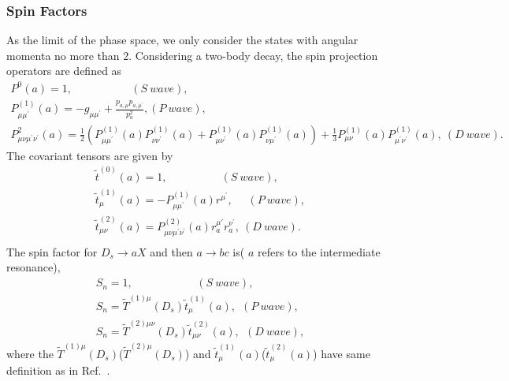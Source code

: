 {    \subsubsection{Spin Factors}
    \par{
        As the limit of the phase space, we only consider the states with angular momenta no more than 2. 
        Considering a two-body decay, the spin projection operators are defined as  
        \begin{equation}
            \begin{array}{lr}
                P^{0}(a) = 1,   \ \ \ \ \ \  \ \ \ \ \ \  \ \ \ \ \ \ \ \ \ \ \ \        (S\ wave), &\\
                P^{(1)}_{\mu\mu^{'}}(a) = -g_{\mu\mu^{'}}+\frac{p_{a,\mu}p_{a,\mu^{'}}}{p_{a}^{2}},          (P\ wave), &\\
                P^{2}_{\mu\nu\mu^{'}\nu^{'}}(a) = \frac{1}{2}(P^{(1)}_{\mu\mu^{'}}(a)P^{(1)}_{\nu\nu^{'}}(a)+P^{(1)}_{\mu\nu^{'}}(a)P^{(1)}_{\nu\mu^{'}}(a))+\frac{1}{3}P^{(1)}_{\mu\nu}(a)P^{(1)}_{\mu^{'}\nu^{'}}(a),\           (D\ wave). &
            \end{array}\label{spin-projection-operators} 
        \end{equation}
       The covariant tensors are given by 
        \begin{equation}
            \begin{array}{lr}
                \tilde{t}^{(0)}(a) = 1, \ \ \ \ \ \  \ \ \ \ \ \   \ \ \ \ \ \ \ \ \ \       (S\ wave), &\\
                \tilde{t}^{(1)}_{\mu}(a) = -P^{(1)}_{\mu\mu^{'}}(a)r^{\mu^{'}},   \ \  \ \ \ \         (P\ wave), &\\
                \tilde{t}^{(2)}_{\mu\nu}(a) = P^{(2)}_{\mu\nu\mu^{'}\nu^{'}}(a)r^{\mu{'}}_{a}r^{\nu^{'}}_{a}, \           (D\ wave). &\\
            \end{array}\label{covariant-tensors} 
        \end{equation}
        The spin factor for $D_{s} \rightarrow aX$ and then $a \rightarrow bc$ is( $a$ refers to the intermediate resonance), 
        \begin{equation}
            \begin{array}{lr}
                S_{n} = 1,         \ \ \ \ \ \  \ \ \ \ \ \ \ \ \ \ \ \  \ \ \ \ \ \ \ \ (S\ wave), &\\
                S_{n} = \tilde{T}^{(1)\mu}(D_{s})\tilde{t}^{(1)}_{\mu}(a),\ \          (P\ wave), &\\
                S_{n} = \tilde{T}^{(2)\mu\nu}(D_{s})\tilde{t}^{(2)}_{\mu\nu}(a),\ \         (D\ wave), &
            \end{array}\label{spin-factor} 
        \end{equation}
        where the $\tilde{T}^{(1)\mu}(D_{s})$($\tilde{T}^{(2)\mu}(D_{s})$) and $\tilde{t}^{(1)}_{\mu}(a)$($\tilde{t}^{(2)}_{\mu}(a)$) have same definition as in Ref.~\cite{covariant-tensors}.
    }

}


